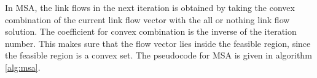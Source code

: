 In MSA, the link flows in the next iteration is obtained by taking
the convex combination of the current link flow vector with
the all or nothing link flow solution. The coefficient for
convex combination is the inverse of the iteration number.
This makes sure that the flow vector lies inside the feasible region,
since the feasible region is a convex set.
The pseudocode for MSA is given in algorithm \ref{alg:msa}.


